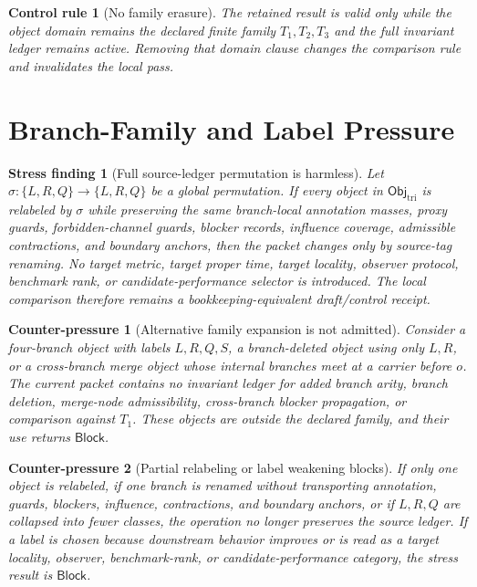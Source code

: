 \documentclass[11pt]{article}
\newcommand{\ObjTri}{\mathsf{Obj}_{\mathrm{tri}}}
\newcommand{\Block}{\mathsf{Block}}
\newtheorem{stressfinding}{Stress finding}
\newtheorem{counterpressure}{Counter-pressure}
\newtheorem{controlrule}{Control rule}
\begin{document}
\begin{controlrule}[No family erasure]
The retained result is valid only while the object domain remains the
declared finite family \(T_{1},T_{2},T_{3}\) and the full invariant
ledger remains active. Removing that domain clause changes the
comparison rule and invalidates the local pass.
\end{controlrule}

\section{Branch-Family and Label Pressure}

\begin{stressfinding}[Full source-ledger permutation is harmless]
Let \(\sigma:\{L,R,Q\}\to\{L,R,Q\}\) be a global permutation. If every
object in \(\ObjTri\) is relabeled by \(\sigma\) while preserving the
same branch-local annotation masses, proxy guards, forbidden-channel
guards, blocker records, influence coverage, admissible contractions,
and boundary anchors, then the packet changes only by source-tag
renaming. No target metric, target proper time, target locality,
observer protocol, benchmark rank, or candidate-performance selector is
introduced. The local comparison therefore remains a
bookkeeping-equivalent draft/control receipt.
\end{stressfinding}

\begin{counterpressure}[Alternative family expansion is not admitted]
Consider a four-branch object with labels \(L,R,Q,S\), a branch-deleted
object using only \(L,R\), or a cross-branch merge object whose internal
branches meet at a carrier before \(o\). The current packet contains no
invariant ledger for added branch arity, branch deletion, merge-node
admissibility, cross-branch blocker propagation, or comparison against
\(T_{1}\). These objects are outside the declared family, and their use
returns \(\Block\).
\end{counterpressure}

\begin{counterpressure}[Partial relabeling or label weakening blocks]
If only one object is relabeled, if one branch is renamed without
transporting annotation, guards, blockers, influence, contractions, and
boundary anchors, or if \(L,R,Q\) are collapsed into fewer classes, the
operation no longer preserves the source ledger. If a label is chosen
because downstream behavior improves or is read as a target locality,
observer, benchmark-rank, or candidate-performance category, the stress
result is \(\Block\).
\end{counterpressure}
\end{document}

